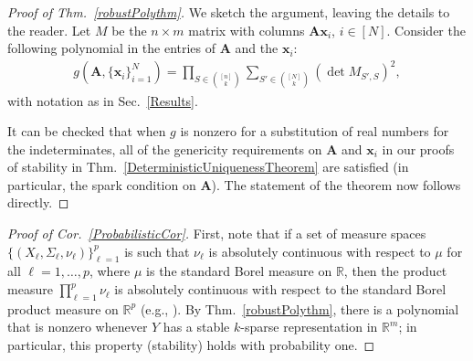 \documentclass[9pt,twocolumn]{pnas-new}
\begin{document}
\begin{proof}[Proof of Thm.~\ref{robustPolythm}]
We sketch the argument, leaving the details to the reader. 
Let $M$ be the $n \times m$ matrix with columns $\mathbf{A}\mathbf{x}_i$, $i \in [N]$.  Consider the following polynomial \cite[Sec.~IV]{Hillar15} in the entries of $\mathbf{A}$ and the $\mathbf{x}_i$:
\begin{align*}
g(\mathbf{A}, \{\mathbf{x}_i\}_{i=1}^N) = \prod_{S \in {[n] \choose k}} \sum_{S' \in {[N] \choose k}} (\det M_{S',S})^2,
\end{align*}
with notation as in Sec.~\ref{Results}.  

It can be checked that when $g$ is nonzero for a substitution of real numbers for the indeterminates, all of the genericity requirements on $\mathbf{A}$ and $\mathbf{x}_i$ in our proofs of stability in Thm.~\ref{DeterministicUniquenessTheorem} are satisfied (in particular, the spark condition on $\mathbf{A}$). The statement of the theorem now follows directly.
\end{proof}

\begin{proof}[Proof of Cor.~\ref{ProbabilisticCor}]
First, note that if a set of measure spaces $\{(X_{\ell}, \Sigma_{\ell}, \nu_{\ell})\}_{\ell=1}^p$ is such that $\nu_{\ell}$ is absolutely continuous with respect to $\mu$ for all $\ell = 1, \ldots, p$, where $\mu$ is the standard Borel measure on $\mathbb{R}$, then the product measure $\prod_{\ell=1}^p \nu_{\ell}$ is absolutely continuous with respect to the standard Borel product measure on $\mathbb{R}^p$ (e.g.,  \cite{folland2013real}). By Thm.~\ref{robustPolythm}, there is a polynomial that is nonzero whenever $Y$ has a stable $k$-sparse representation in $\mathbb R^m$; in particular, this property (stability) holds with probability one.
\end{proof}


%
\end{document}

